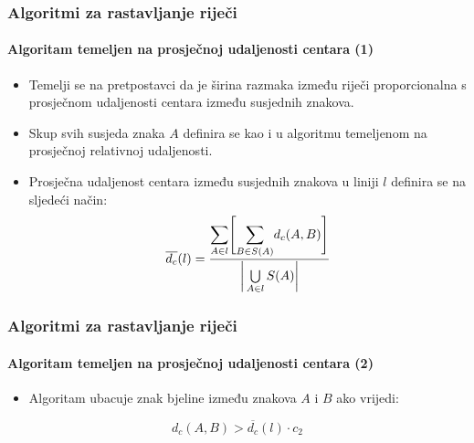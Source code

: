 \documentclass{beamer}
\begin{document}
\begin{frame}
\frametitle{Algoritmi za rastavljanje riječi}
\framesubtitle{Algoritam temeljen na prosječnoj udaljenosti centara (1)}
\begin{itemize}
    \item Temelji se na pretpostavci da je širina razmaka između riječi proporcionalna
          s prosječnom udaljenosti centara između susjednih znakova.
    \item Skup svih susjeda znaka $A$ definira se kao i u algoritmu temeljenom
          na prosječnoj relativnoj udaljenosti.
    \item Prosječna udaljenost centara između susjednih znakova u liniji
          $l$ definira se na sljedeći način:
    \begin{equation}
    \overline{d_c}(l) =
    \frac{
        \mathlarger{\sum}\limits_{A \in l}
        \Bigg[
        \mathlarger{\sum}\limits_{B \in S(A)} d_c(A, B)
        \Bigg]
    }
    {\bigg|\bigcup\limits_{A \in l} S(A)\bigg|}
    \end{equation}
\end{itemize}
\end{frame}
\begin{frame}
\frametitle{Algoritmi za rastavljanje riječi}
\framesubtitle{Algoritam temeljen na prosječnoj udaljenosti centara (2)}
\begin{itemize}
\item Algoritam ubacuje znak bjeline između znakova $A$ i $B$ ako vrijedi:
\end{itemize}
\begin{equation}
d_c(A, B) > \overline{d_c}(l) \cdot c_2
\end{equation}
\end{frame}
\end{document}
